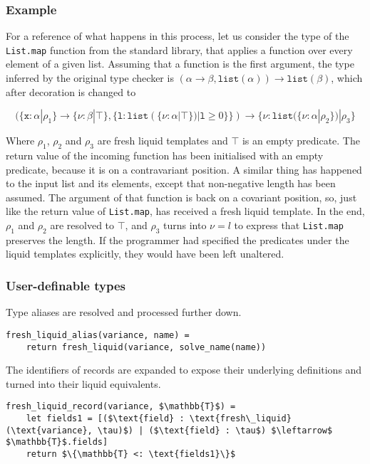 \subsubsection{Example}

For a reference of what happens in this process, let us consider the type of the
\texttt{List.map} function from the standard library, that applies a function
over every element of a given list. Assuming that a function is the first
argument, the type inferred by the original type checker is $(\alpha \to \beta,
\texttt{list}(\alpha)) \to \texttt{list}(\beta)$, which after decoration is
changed to

$$(\{\texttt{x} : \alpha | \rho_1\} \to \{\nu : \beta | \top\},
\{\texttt{l} : \texttt{list}(\{\nu : \alpha | \top\}) | \texttt{l} \geq 0\}\})
\to \{\nu : \texttt{list}(\{\nu : \alpha | \rho_2\}) | \rho_3\}$$

Where $\rho_1$, $\rho_2$ and $\rho_3$ are fresh liquid templates and $\top$ is an
empty predicate. The return value of the incoming function has been initialised
with an empty predicate, because it is on a contravariant position. A similar
thing has happened to the input list and its elements, except that non-negative
length has been assumed. The argument of that function is back on a covariant
position, so, just like the return value of \texttt{List.map}, has received a
fresh liquid template. In the end, $\rho_1$ and $\rho_2$ are resolved to $\top$,
and $\rho_3$ turns into $\nu = l$ to express that \texttt{List.map} preserves
the length. If the programmer had specified the predicates under the liquid
templates explicitly, they would have been left unaltered.

\subsubsection{User-definable types}
\label{user_definable_types}

Type aliases are resolved and processed further down.

\begin{lstlisting}[language=pseudocode]
fresh_liquid_alias(variance, name) =
    return fresh_liquid(variance, solve_name(name))
\end{lstlisting}

The identifiers of records are expanded to expose their underlying definitions
and turned into their liquid equivalents.

\begin{lstlisting}[language=pseudocode]
fresh_liquid_record(variance, $\mathbb{T}$) =
    let fields1 = [($\text{field} : \text{fresh\_liquid}(\text{variance}, \tau)$) | ($\text{field} : \tau$) $\leftarrow$ $\mathbb{T}$.fields]
    return $\{\mathbb{T} <: \text{fields1}\}$
\end{lstlisting}

